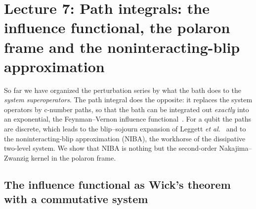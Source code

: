 \section{Lecture 7: Path integrals: the influence functional, the polaron frame and the noninteracting-blip approximation}
\label{sec:lec7}

So far we have organized the perturbation series by what the bath does to the \emph{system superoperators}.
The path integral does the opposite: it replaces the system operators by c-number paths, so that the bath can be integrated out \emph{exactly} into an exponential, the Feynman--Vernon influence functional~\cite{FeynmanVernon1963}.
For a qubit the paths are discrete, which leads to the blip--sojourn expansion of Leggett \emph{et al.}~\cite{Leggett1987} and to the noninteracting-blip approximation (NIBA), the workhorse of the dissipative two-level system.
We show that NIBA is nothing but the second-order Nakajima--Zwanzig kernel in the polaron frame.

\subsection{The influence functional as Wick's theorem with a commutative system}
\label{sec:FV-derivation}

